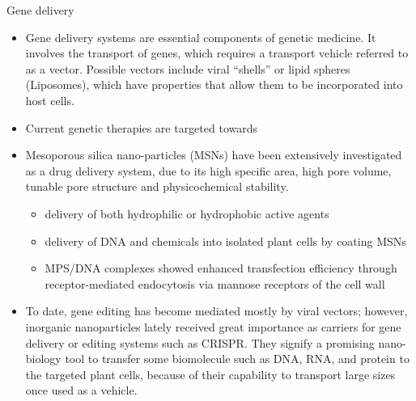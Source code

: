 \documentclass[11pt,dvipsnames,ignorenonframetext,aspectratio=169]{beamer}
\providecommand{\tightlist}{%
  \setlength{\itemsep}{0pt}\setlength{\parskip}{0pt}}
\newcommand{\ecolumns}{\end{columns}}
\begin{document}

\begin{frame}{Gene delivery}
\protect\hypertarget{gene-delivery}{}
\footnotesize

\begin{itemize}
\tightlist
\item
  Gene delivery systems are essential components of genetic medicine. It
  involves the transport of genes, which requires a transport vehicle
  referred to as a \alert{vector}. Possible vectors include viral
  ``shells'' or lipid spheres (Liposomes), which have properties that
  allow them to be incorporated into host cells.
\item
  Current genetic therapies are targeted towards
\item
  Mesoporous silica nano-particles (MSNs) have been extensively
  investigated as a drug delivery system, due to its high specific area,
  high pore volume, tunable pore structure and physicochemical
  stability.

  \begin{itemize}
  \footnotesize
  \item delivery of both hydrophilic or hydrophobic active agents
  \item delivery of DNA and chemicals into isolated plant cells by coating MSNs
  \item MPS/DNA complexes showed enhanced transfection efficiency through receptor-mediated endocytosis via mannose receptors of the cell wall
  \end{itemize}
\item
  To date, gene editing has become mediated mostly by viral vectors;
  however, inorganic nanoparticles lately received great importance as
  carriers for gene delivery or editing systems such as CRISPR. They
  signify a promising nano-biology tool to transfer some biomolecule
  such as DNA, RNA, and protein to the targeted plant cells, because of
  their capability to transport large sizes once used as a vehicle.
\end{itemize}
\end{frame}
\end{document}
